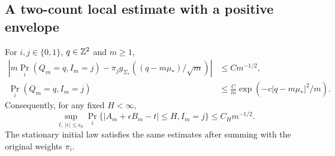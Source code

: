 \subsection{A two-count local estimate with a positive envelope}
\begin{lemma}
\label{lem:v60-joint-lattice}
For $i,j\in\{0,1\}$, $q\in\mathbb Z^2$ and $m\ge1$,
\begin{align}
 \left|m\Pr_i(Q_m=q,I_m=j)
       -\pi_jg_{\Sigma_*}((q-m\mu_*)/\sqrt m)\right|
            &\le C m^{-1/2},                       \label{eq:v60-joint-LLT}\\
 \Pr_i(Q_m=q,I_m=j)
            &\le \frac{C}{m}\exp(-c|q-m\mu_*|^2/m).
                                                        \label{eq:v60-joint-upper}
\end{align}
Consequently, for any fixed $H<\infty$,
\begin{equation}\label{eq:v60-strip-upper}
 \sup_{t,\ |\epsilon|\le\epsilon_0}
 \Pr_i\{|A_m+\epsilon B_m-t|\le H,I_m=j\}
                                \le C_Hm^{-1/2}.
\end{equation}
The stationary initial law satisfies the same estimates after summing
with the original weights $\pi_i$.
\end{lemma}
